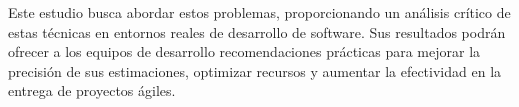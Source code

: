 Este estudio busca abordar estos problemas, proporcionando un análisis crítico de estas técnicas en entornos reales de desarrollo de software. Sus resultados podrán ofrecer a los equipos de desarrollo recomendaciones prácticas para mejorar la precisión de sus estimaciones, optimizar recursos y aumentar la efectividad en la entrega de proyectos ágiles.
